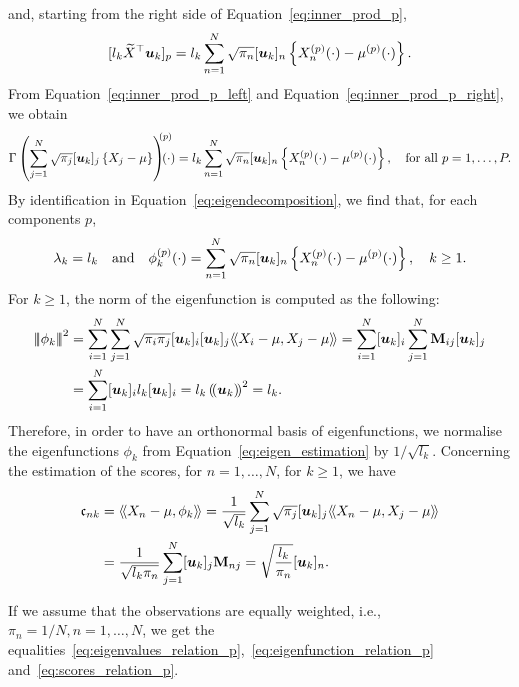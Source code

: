 and, starting from the right side of Equation~\eqref{eq:inner_prod_p},
\begin{equation}\label{eq:inner_prod_p_right}
    [l_k \widetilde{X}^\top \boldsymbol{u}_k]_p = l_k \sum_{n = 1}^N \sqrt{\pi_n}[\boldsymbol{u}_{k}]_n \left\{X_n^{(p)}(\cdot) - \mu^{(p)}(\cdot)\right\}.
\end{equation}
From Equation~\eqref{eq:inner_prod_p_left} and Equation~\eqref{eq:inner_prod_p_right}, we obtain
\begin{equation}
    \Gamma\left(\sum_{j = 1}^N \sqrt{\pi_j}[\boldsymbol{u}_{k}]_j \left\{X_j - \mu\right\}\right)^{\mkern-9mu(p)}\mkern-18mu(\cdot) = l_k \sum_{n = 1}^N \sqrt{\pi_n}[\boldsymbol{u}_{k}]_n \left\{X_n^{(p)}(\cdot) - \mu^{(p)}(\cdot)\right\}, \quad\text{for all}~ p = 1, \dots, P.
\end{equation}
By identification in Equation~\eqref{eq:eigendecomposition}, we find that, for each components $p$,
\begin{equation}\label{eq:eigen_estimation}
\lambda_k = l_k \quad\text{and}\quad \phi_k^{(p)}(\cdot) = \sum_{n = 1}^N \sqrt{\pi_n}[\boldsymbol{u}_{k}]_n \left\{X_n^{(p)}(\cdot) - \mu^{(p)}(\cdot)\right\}, \quad k \geq 1.
\end{equation}
For $k \geq 1$, the norm of the eigenfunction is computed as the following:
\begin{align*}
\normH{\phi_k}^2 &= \sum_{i = 1}^N \sum_{j = 1}^N \sqrt{\pi_i\pi_j}[\boldsymbol{u}_{k}]_i [\boldsymbol{u}_{k}]_j\inH{X_i - \mu}{X_j - \mu} = \sum_{i = 1}^N [\boldsymbol{u}_{k}]_i \sum_{j = 1}^N \mathbf{M}_{ij} [\boldsymbol{u}_{k}]_j \\
    &= \sum_{i = 1}^N [\boldsymbol{u}_{k}]_i l_k [\boldsymbol{u}_{k}]_i = l_k \normR{\boldsymbol{u}_k}^2 = l_k. \\
\end{align*}
Therefore, in order to have an orthonormal basis of eigenfunctions, we normalise the eigenfunctions $\phi_k$ from Equation~\eqref{eq:eigen_estimation} by $1 / \sqrt{l_k}$.
Concerning the estimation of the scores, for $n = 1, \dots, N$, for $k \geq 1$, we have
\begin{align}
    \mathfrak{c}_{nk} &= \langle\!\langle X_n - \mu, \phi_k\rangle\!\rangle = \frac{1}{\sqrt{l_k}}\sum_{j = 1}^N \sqrt{\pi_j}[\boldsymbol{u}_{k}]_j \langle\!\langle X_n - \mu, X_j - \mu\rangle\!\rangle\\
    &= \frac{1}{\sqrt{l_k\pi_n}}\sum_{j = 1}^N [\boldsymbol{u}_{k}]_j \mathbf{M}_{nj} = \sqrt{\frac{l_k}{\pi_n}}[\boldsymbol{u}_{k}]_n.\\
\end{align}

If we assume that the observations are equally weighted, i.e., $\pi_n = 1 / N, n = 1, \dots, N$, we get the equalities~\eqref{eq:eigenvalues_relation_p},~\eqref{eq:eigenfunction_relation_p} and~\eqref{eq:scores_relation_p}.


